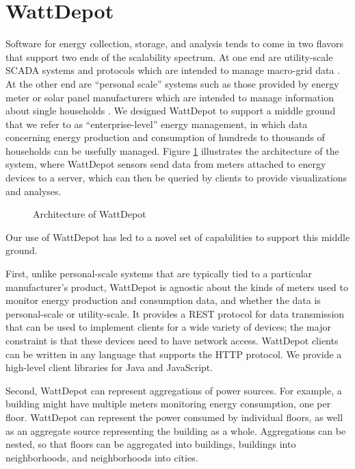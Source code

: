 \section{WattDepot}

Software for energy collection, storage, and analysis tends to come in two flavors that support two ends of the scalability spectrum.  At one end are utility-scale SCADA systems and protocols which are intended to manage macro-grid data \cite{SmartEnergy2.0,OSHAN,OpenPDC}.  At the other end are ``personal scale'' systems such as those provided by energy meter or solar panel manufacturers which are intended to manage information about single households \cite{TED,EMS100}.  We designed WattDepot to support a middle ground that we refer to as ``enterprise-level'' energy management, in which data concerning energy production and consumption of hundreds to thousands of households can be usefully managed.  Figure \ref{fig:wattdepot} illustrates the architecture of the system, where WattDepot sensors send data from meters attached to energy devices to a server, which can then be queried by clients to provide visualizations and analyses.

\begin{figure}
\begin{center}
\end{center}
\caption{Architecture of WattDepot}
\label{fig:wattdepot}
\end{figure}

Our use of WattDepot has led to a novel set of capabilities to support this middle ground.

First, unlike personal-scale systems that are typically tied to a particular manufacturer's product, WattDepot is agnostic about the kinds of meters used to monitor energy production and consumption data, and whether the data is personal-scale or utility-scale. It provides a REST protocol for data transmission that can be used to implement clients for a wide variety of devices; the major constraint is that these devices need to have network access. WattDepot clients can be written in any language that supports the HTTP protocol. We provide a high-level client libraries for Java and JavaScript.

Second, WattDepot can represent aggregations of power sou\-rces. For example, a building might have multiple meters monitoring energy consumption, one per floor. WattDepot can represent the power consumed by individual floors, as well as an aggregate source representing the building as a whole. Aggregations can be nested, so that floors can be aggregated into buildings, buildings into neighborhoods, and neighborhoods into cities.

